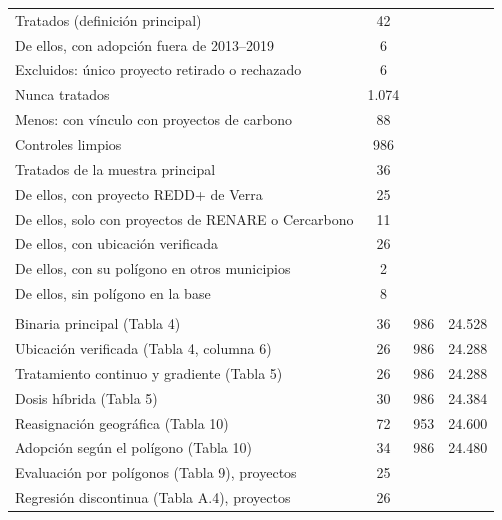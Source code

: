 \begin{table}[htbp]
\begin{threeparttable}
\begin{tabular}{@{}lccc@{}}
Tratados (definición principal) & 42 &  &  \\
De ellos, con adopción fuera de 2013--2019 & 6 &  &  \\
Excluidos: único proyecto retirado o rechazado & 6 &  &  \\
Nunca tratados & 1.074 &  &  \\
Menos: con vínculo con proyectos de carbono & 88 &  &  \\
Controles limpios & 986 &  &  \\
Tratados de la muestra principal & 36 &  &  \\
De ellos, con proyecto REDD+ de Verra & 25 &  &  \\
De ellos, solo con proyectos de RENARE o Cercarbono & 11 &  &  \\
De ellos, con ubicación verificada & 26 &  &  \\
De ellos, con su polígono en otros municipios & 2 &  &  \\
De ellos, sin polígono en la base & 8 &  &  \\
\addlinespace
\multicolumn{4}{@{}l}{\textit{Panel E. Muestra de cada especificación}} \\
Binaria principal (Tabla 4) & 36 & 986 & 24.528 \\
Ubicación verificada (Tabla 4, columna 6) & 26 & 986 & 24.288 \\
Tratamiento continuo y gradiente (Tabla 5) & 26 & 986 & 24.288 \\
Dosis híbrida (Tabla 5) & 30 & 986 & 24.384 \\
Reasignación geográfica (Tabla 10) & 72 & 953 & 24.600 \\
Adopción según el polígono (Tabla 10) & 34 & 986 & 24.480 \\
Evaluación por polígonos (Tabla 9), proyectos & 25 &  &  \\
Regresión discontinua (Tabla A.4), proyectos & 26 &  &  \\
\bottomrule
\end{tabular}
\begin{tablenotes}[flushleft]
\footnotesize

\end{tablenotes}
\end{threeparttable}
\end{table}
